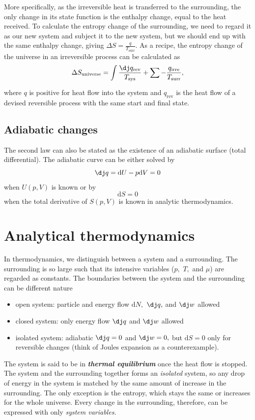 \documentclass{article}
\theoremstyle{nonumberplain}
\begin{document}
More specifically, as the irreversible heat is transferred to the surrounding, the only change in its state function is the enthalpy change, equal to the heat received. To calculate the entropy change of the surrounding, we need to regard it as our new system and subject it to the new system, but we should end up with the same enthalpy change, giving $\Delta S = \frac{q}{T_{\mathrm{surr} }}. $ As a recipe, the entropy change of the universe in an irreversible process can be calculated as
\[
    \Delta S_{\mathrm{universe} } = \int \frac{\dj q_{\mathrm{rev} }}{T_{\mathrm{sys} }} + \sum_{}^{} - \frac{q_{\mathrm{irre} }}{T_{\mathrm{surr} }}, 
\]
where $q$ is positive for heat flow into the system and $q_{\mathrm{rev} }$ is the heat flow of a devised reversible process with the same start and final state. 

\subsection{Adiabatic changes}
The second law can also be stated as the existence of an adiabatic surface (total differential). The adiabatic curve can be either solved by 
\[
    \mathrm{\dj} q = \mathrm{d} U - p \mathrm{d} V = 0 
\]
when $U(p, V)$ is known or by 
\[
    \mathrm{d} S = 0
\]
when the total derivative of $S(p,V)$ is known in analytic thermodynamics.
\section{Analytical thermodynamics}
In thermodynamics, we distinguish between a system and a surrounding. The surrounding is so large such that its intensive variables ($p,$ $T,$ and $\mu $) are regarded as constants. The boundaries between the system and the surrounding can be different nature 
\begin{itemize}
    \item open system: particle and energy flow $\mathrm{d} N,$ $\mathrm{\dj}q,$ and $\mathrm{\dj}w $ allowed
    \item closed system: only energy flow $\mathrm{\dj}q $ and $\mathrm{\dj}w $ allowed 
    \item isolated system: adiabatic $\mathrm{\dj} q = 0$ and $\mathrm{\dj}w  =0,$ but $\mathrm{d} S = 0$ only for reversible changes (think of Joules expansion as a counterexample).
\end{itemize}
The system is said to be in \textit{\textbf{thermal equilibrium}} once the heat flow is stopped. The system and the surrounding together forms an \textit{isolated} system, so any drop of energy in the system is matched by the same amount of increase in the surrounding. The only exception is the entropy, which stays the same or increases for the whole universe. Every change in the surrounding, therefore, can be expressed with only \textit{system variables.}
\end{document}
